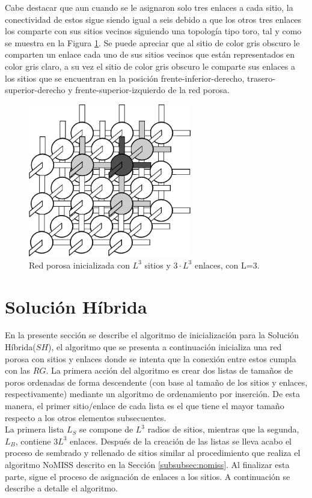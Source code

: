 Cabe destacar que aun cuando se le asignaron solo tres enlaces a cada sitio, la conectividad de estos sigue siendo igual a seis debido a que los otros tres enlaces los comparte con sus sitios vecinos siguiendo una topología tipo toro, tal y como se muestra  en la Figura \ref{fig:redinit}. Se puede apreciar que al sitio de color gris obscuro le comparten un enlace cada uno de  sus sitios vecinos que están representados en color gris claro, a su vez el sitio de color gris obscuro le comparte sus enlaces  a los sitios que se encuentran en la posición frente-inferior-derecho, trasero-superior-derecho y frente-superior-izquierdo de la red porosa.\\

\begin{figure}[hbtp]
\centering
\includegraphics[width=2.8in]{img/red2.pdf}
\caption{Red porosa inicializada con $L^3$ sitios y $3 \cdot L^3$ enlaces, con L=3.}
\label{fig:redinit}
\end{figure}
  
\section{Solución Híbrida}
\label{sec:hybrid}
En la presente sección se describe el algoritmo de inicialización para la Solución Híbrida($SH$), el algoritmo que se presenta a continuación inicializa una red porosa con sitios y enlaces donde se intenta que la conexión entre estos cumpla con las $RG$. La primera acción del algoritmo es crear dos listas de tamaños de poros ordenadas de forma descendente (con base al tamaño de los sitios y enlaces, respectivamente) mediante un algoritmo de ordenamiento por inserción.  De esta manera, el primer sitio/enlace de cada lista es el que tiene el mayor tamaño respecto a los otros elementos subsecuentes.\\

La primera lista $L_S$ se compone de $L^3$ radios de sitios, mientras que la segunda, $L_B$, contiene $3L^3$ enlaces. Después de la creación de las listas se lleva acabo el proceso de sembrado y rellenado de sitios similar al procedimiento que realiza el algoritmo NoMISS descrito en la Sección \ref{subsubsec:nomiss}. Al finalizar esta parte, sigue el proceso de asignación de enlaces a los sitios.  A continuación se describe a detalle el algoritmo.

